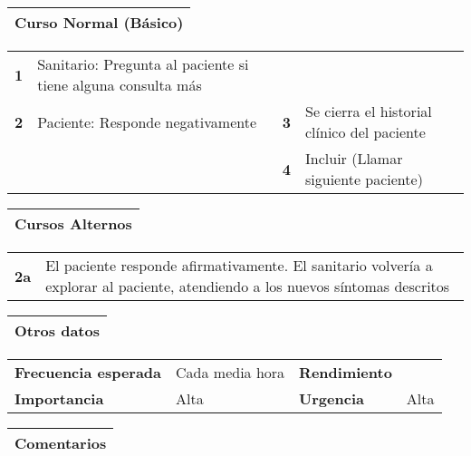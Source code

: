 \documentclass[11pt,a4paper]{article}
\begin{document}
\begin{table}[H]
	\begin{tabularx}{\textwidth}{X}
		\textbf{Curso Normal (Básico)}\\ \hline
	\end{tabularx}
	\begin{tabularx}{\textwidth}{cXcX}
		\textbf{1} & Sanitario: Pregunta al paciente si tiene alguna consulta más & & \\
		\textbf{2} & Paciente: Responde negativamente & \textbf{3} & Se cierra el historial clínico del paciente \\
		 & & \textbf{4} & Incluir (Llamar siguiente paciente) \\
	\end{tabularx}
        \begin{tabularx}{\textwidth}{X}
	  \textbf{Cursos Alternos}\\ \hline
	\end{tabularx}
	\begin{tabularx}{\textwidth}{cX}
	  \textbf{2a} & El paciente responde afirmativamente. El sanitario volvería a explorar al paciente, atendiendo a los nuevos síntomas descritos \\
	\end{tabularx}
\end{table}

\begin{table}[H]
	\begin{tabularx}{\textwidth}{X}
		\textbf{Otros datos}\\ \hline
	\end{tabularx}
	\begin{tabularx}{\textwidth}{lXlX}
		\textbf{Frecuencia esperada} & Cada media hora & \textbf{Rendimiento} & \\
		\textbf{Importancia} & Alta & \textbf{Urgencia} & Alta\\
	\end{tabularx}
	\begin{tabularx}{\textwidth}{X}
		\textbf{Comentarios}\\ \hline	
	\end{tabularx}
\end{table}
\end{document}
